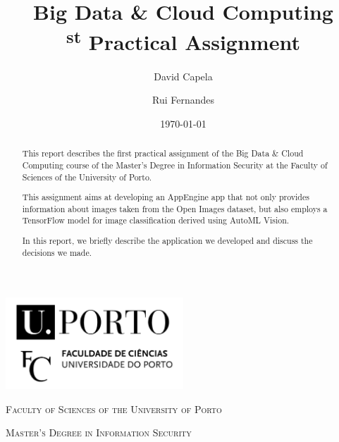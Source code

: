 \documentclass[a4paper, 11pt]{article}
\title{Big Data \& Cloud Computing \\ [0.8em] \smaller 1\textsuperscript{st} Practical Assignment}
\author{David Capela \and Rui Fernandes}
\date{\today}
\begin{document}
\renewcommand\labelitemi{--}
\renewcommand{\today}{\ifcase \month\or January\or February\or March\or %
April\or May\or June\or July\or August\or September\or October\or November\or %
December\fi, \number \year}

\begin{titlepage}
    \begin{center}
        \begin{minipage}{.75\linewidth}
            \centering
            \includegraphics[width=0.5\textwidth]{img/fcup.jpg}\par\vspace{1cm}
            \vspace{1.5cm}
            {\scshape\LARGE Faculty of Sciences of the University of Porto} \par
            \vspace{1cm}
            {\scshape\Large Master's Degree in Information Security} \par
            \vspace{1.5cm}
            \maketitle
        \end{minipage}
    \end{center}
    \vspace{2cm}
    \thispagestyle{empty}
    \pagebreak
\end{titlepage}


\begin{abstract}
This report describes the first practical assignment of the Big Data \& Cloud Computing course of 
the Master's Degree in Information Security at the Faculty of Sciences of the University of Porto.

This assignment aims at developing an AppEngine app that not only provides information about images 
taken from the Open Images dataset, but also employs a TensorFlow model for image classification 
derived using AutoML Vision.

In this report, we briefly describe the application we developed and discuss the decisions we made. 
\end{abstract}
\end{document}
